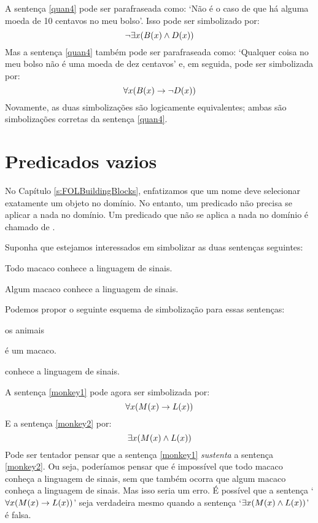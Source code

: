 A sentença \ref{quan4} pode ser parafraseada como:
`Não é o caso de que há alguma moeda de 10 centavos no meu bolso'.
Isso pode ser simbolizado por:
$$\neg\exists x(\mathord{B}(x) \wedge \mathord{D}(x))$$
Mas a sentença \ref{quan4} também pode ser parafraseada  como:
`Qualquer coisa no meu bolso não é uma moeda de dez centavos' e, em seguida, pode ser simbolizada por:
$$\forall x(\mathord{B}(x) \rightarrow \neg \mathord{D}(x))$$
Novamente, as duas simbolizações são logicamente equivalentes; ambas são simbolizações corretas da sentença \ref{quan4}.


\section{Predicados vazios}\label{s:PredVaz}

No Capítulo \ref{s:FOLBuildingBlocks}, enfatizamos que um nome deve selecionar exatamente um objeto no domínio.
No entanto, um predicado não precisa se aplicar a nada no domínio.
Um predicado que não se aplica a nada no domínio é chamado de .


Suponha que estejamos interessados em  simbolizar as duas sentenças seguintes:
	\begin{earg}
		\item[\ex{monkey1}] Todo macaco conhece a linguagem de sinais.
		\item[\ex{monkey2}] Algum macaco conhece a linguagem de sinais.
	\end{earg}
Podemos propor o seguinte esquema de simbolização para essas sentenças:
	\begin{center}
	\begin{ekey}
		\item[\text{domínio}] os animais
		\item[\atom{M}{x}]  é um macaco.
		\item[\atom{L}{x}]  conhece a linguagem de sinais.
	\end{ekey}
	\end{center}
A sentença \ref{monkey1} pode agora ser simbolizada por:
$$\forall x(\mathord{M}(x) \rightarrow \mathord{L}(x))$$
E a sentença \ref{monkey2} por:
$$\exists x(\mathord{M}(x) \wedge \mathord{L}(x))$$
Pode ser tentador pensar que a sentença \ref{monkey1} \emph{sustenta} a sentença \ref{monkey2}.
Ou seja, poderíamos pensar que é impossível que todo macaco conheça a linguagem de sinais, sem que também ocorra que algum macaco conheça a linguagem de sinais.
Mas isso seria um erro.
É possível que a sentença `$\forall x(\mathord{M}(x) \rightarrow \mathord{L}(x))$' seja verdadeira mesmo quando a sentença `$\exists x(\mathord{M}(x) \wedge \mathord{L}(x))$' é falsa.

